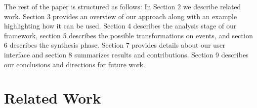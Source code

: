 \documentclass[a4paper]{article}
\begin{document}



The rest of the paper is structured as follows: In Section 2 we describe 
related work. Section 3 provides an overview of our 
approach along with an example highlighting how it can be used. Section 4 
describes the analysis stage of our framework, section 5 describes the possible 
transformations on events, and section 6 describes the synthesis phase. 
Section 7 provides details about our user interface and section 8 summarizes results 
and contributions. Section 9 describes our conclusions and directions for future work. 


\section{Related Work}
\end{document}
